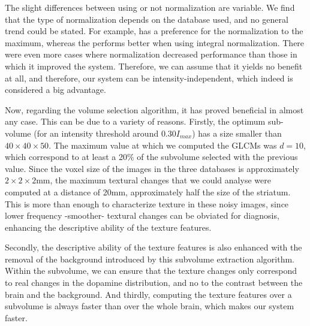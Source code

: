 The slight differences between using or not normalization are variable. We find that the type of normalization depends on the database used, and no general trend could be stated. For example, \vdlvdat{} has a preference for the normalization to the maximum, whereas the \ppmidat{} performs better when using integral normalization. There were even more cases where normalization decreased performance than those in which it improved the system. Therefore, we can assume that it yields no benefit at all, and therefore, our system can be intensity-independent, which indeed is considered a big advantage. 

Now, regarding the volume selection algorithm, it has proved beneficial in almost any case. This can be due to a variety of reasons. Firstly, the optimum sub-volume (for an intensity threshold around $0.30 I_{max}$) has a size smaller than $40\times40\times50$. The maximum value at which we computed the \acp{GLCM} was $d=10$, which correspond to at least a 20\% of the subvolume selected with the previous value. Since the voxel size of the images in the three databases is approximately $2\times2\times2$mm, the maximum textural changes that we could analyse were computed at a distance of 20mm, approximately half the size of the striatum. This is more than enough to characterize texture in these noisy images, since lower frequency -smoother- textural changes can be obviated for diagnosis, enhancing the descriptive ability of the texture features. 

Secondly, the descriptive ability of the texture features is also enhanced with the removal of the background introduced by this subvolume extraction algorithm. Within the subvolume, we can ensure that the texture changes only correspond to real changes in the dopamine distribution, and no to the contrast between the brain and the background. And thirdly, computing the texture features over a subvolume is always faster than over the whole brain, which makes our system faster. 

